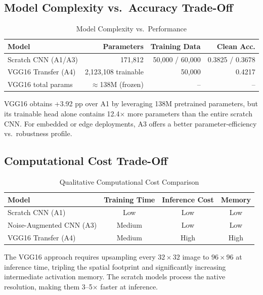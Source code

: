 \documentclass[12pt,a4paper]{article}
\begin{document}
\subsection{Model Complexity vs.\ Accuracy Trade-Off}

\begin{table}[H]
\centering
\caption{Model Complexity vs.\ Performance}
\begin{tabular}{lrrr}
\toprule
\textbf{Model} & \textbf{Parameters} & \textbf{Training Data} & \textbf{Clean Acc.} \\
\midrule
Scratch CNN (A1/A3) & 171{,}812   & 50{,}000 / 60{,}000 & 0.3825 / 0.3678 \\
VGG16 Transfer (A4) & 2{,}123{,}108 trainable & 50{,}000 & 0.4217 \\
\midrule
VGG16 total params  & $\approx$138M (frozen) & -- & -- \\
\bottomrule
\end{tabular}
\end{table}

VGG16 obtains +3.92 pp over A1 by leveraging 138M pretrained parameters, but its trainable head alone contains 12.4$\times$ more parameters than the entire scratch CNN. For embedded or edge deployments, A3 offers a better parameter-efficiency vs.\ robustness profile.

\subsection{Computational Cost Trade-Off}

\begin{table}[H]
\centering
\caption{Qualitative Computational Cost Comparison}
\begin{tabular}{lccc}
\toprule
\textbf{Model} & \textbf{Training Time} & \textbf{Inference Cost} & \textbf{Memory} \\
\midrule
Scratch CNN (A1)         & Low       & Low      & Low \\
Noise-Augmented CNN (A3) & Medium    & Low      & Low \\
VGG16 Transfer (A4)      & Medium    & High     & High \\
\bottomrule
\end{tabular}
\end{table}

The VGG16 approach requires upsampling every $32\times32$ image to $96\times96$ at inference time, tripling the spatial footprint and significantly increasing intermediate activation memory. The scratch models process the native resolution, making them 3--5$\times$ faster at inference.
\end{document}

